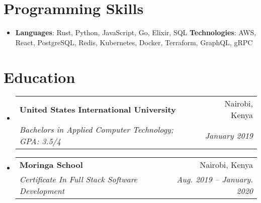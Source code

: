 \documentclass[letterpaper,11pt]{article}
\makeatletter
\newcommand{\resumeSubheading}[4]{
  \vspace{-1pt}\item
    \begin{tabular*}{0.97\textwidth}{l@{\extracolsep{\fill}}r}
      \textbf{#1} & #2 \\
      \textit{\small#3} & \textit{\small #4} \\
    \end{tabular*}\vspace{-5pt}
}
\newcommand{\resumeSubHeadingListStart}{\begin{itemize}[leftmargin=*]}
\newcommand{\resumeSubHeadingListEnd}{\end{itemize}}
\makeatother
\begin{document}
\section{Programming Skills}
 \resumeSubHeadingListStart
   \item{
     \textbf{Languages}{: Rust, Python, JavaScript, Go, Elixir, SQL}
     \hfill
   }{
     \textbf{Technologies}{: AWS, React, PostgreSQL, Redis, Kubernetes, Docker, Terraform, GraphQL, gRPC}
   }
 \resumeSubHeadingListEnd




\section{Education}
  \resumeSubHeadingListStart
    \resumeSubheading
      {United States International University}{Nairobi, Kenya}
      {Bachelors in Applied Computer Technology;  GPA: 3.5/4}{January 2019}
    \resumeSubheading
      {Moringa School}{Nairobi, Kenya}
      {Certificate In Full Stack Software Development}{Aug. 2019 -- January. 2020}
  \resumeSubHeadingListEnd
\end{document}
